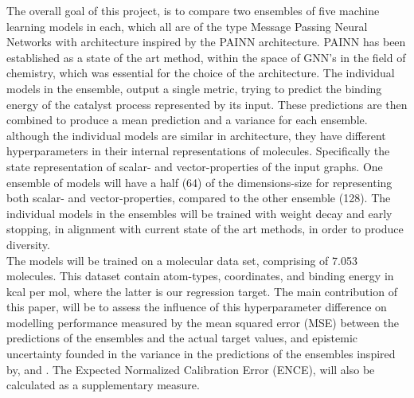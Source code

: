 The overall goal of this project, is to compare two ensembles of five machine learning models in each,
which all are of the type Message Passing Neural Networks with architecture inspired by the
PAINN architecture\cite{PAINN}. PAINN has been established as a state of the art method, within the space of GNN's in the field of chemistry,
which was essential for the choice of the architecture. The individual models in the ensemble, output a single metric,
trying to predict the binding energy of the catalyst process represented by its input.
These predictions are then combined to produce a mean prediction and a variance for each ensemble.
although the individual models are similar in architecture, they have different hyperparameters in their internal representations
of molecules. Specifically the state representation of scalar- and vector-properties of the input graphs.
One ensemble of models will have a half (64)
of the dimensions-size for representing both scalar- and vector-properties, compared to the other ensemble (128).
The individual models in the ensembles will be trained with weight decay and early stopping,
in alignment with current state of the art methods, in order to produce diversity. \\

The models will be trained
on a molecular data set\cite{Meyer2018}, comprising of 7.053 molecules. This dataset contain atom-types, coordinates, and binding
energy in kcal per mol, where the latter is our regression target.
The main contribution of this paper,
will be to assess the influence of this hyperparameter difference on modelling performance measured by the mean squared
error (MSE)
between the predictions of the ensembles and the actual target values,
and epistemic uncertainty founded in the variance in the predictions of the ensembles inspired by\cite{Lakshminarayanan2016},
and \cite{Tran2019}. The Expected Normalized Calibration Error (ENCE), will also be calculated as a supplementary measure.\\

